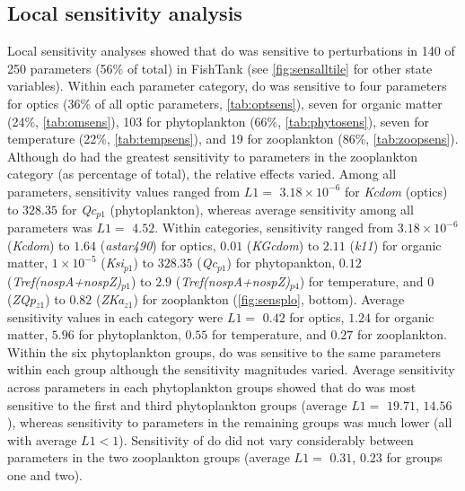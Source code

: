 \documentclass[letterpaper,12pt,oneside]{article}\usepackage[]{graphicx}\usepackage[]{color}
\begin{document}


\subsection{Local sensitivity analysis}

Local sensitivity analyses showed that \ac{do} was sensitive to perturbations in 140 of 250 parameters (56\% of total) in FishTank (see \cref{fig:sensalltile} for other state variables). Within each parameter category, \ac{do} was sensitive to four parameters for optics (36\% of all optic parameters, \cref{tab:optsens}), seven for organic matter (24\%, \cref{tab:omsens}), 103 for phytoplankton (66\%, \cref{tab:phytosens}), seven for temperature (22\%, \cref{tab:tempsens}), and 19 for zooplankton (86\%, \cref{tab:zoopsens}). Although \ac{do} had the greatest sensitivity to parameters in the zooplankton category (as percentage of total), the relative effects varied. Among all parameters, sensitivity values ranged from $L1 = $ $3.18\times 10^{-6}$ for \textit{Kcdom} (optics) to $328.35$ for \textit{Qc$_{p1}$} (phytoplankton), whereas average sensitivity among all parameters was $L1 = $ $4.52$.  Within categories, sensitivity ranged from $3.18\times 10^{-6}$ (\textit{Kcdom}) to $1.64$ (\textit{astar490}) for optics, $0.01$ (\textit{KGcdom}) to $2.11$ (\textit{k11}) for organic matter, $1\times 10^{-5}$ (\textit{Ksi$_{p1}$}) to $328.35$ (\textit{Qc$_{p1}$}) for phytopankton, $0.12$ (\textit{Tref(nospA+nospZ)$_{p1}$}) to $2.9$ (\textit{Tref(nospA+nospZ)$_{p4}$}) for temperature, and $0$ (\textit{ZQp$_{z1}$}) to $0.82$ (\textit{ZKa$_{z1}$}) for zooplankton (\cref{fig:sensplo}, bottom).  Average sensitivity values in each category were $L1 = $ $0.42$ for optics, $1.24$ for organic matter, $5.96$ for phytoplankton, $0.55$ for temperature, and $0.27$ for zooplankton.  Within the six phytoplankton groups, \ac{do} was sensitive to the same parameters within each group although the sensitivity magnitudes varied. Average sensitivity across parameters in each phytoplankton groups showed that \ac{do} was most sensitive to the first and third phytoplankton groups (average $L1 = $ $19.71$, $14.56$), whereas sensitivity to parameters in the remaining groups was much lower (all with average $L1 < 1$). Sensitivity of \ac{do} did not vary considerably between parameters in the two zooplankton groups (average $L1 = $ $0.31$, $0.23$ for groups one and two).
\end{document}
